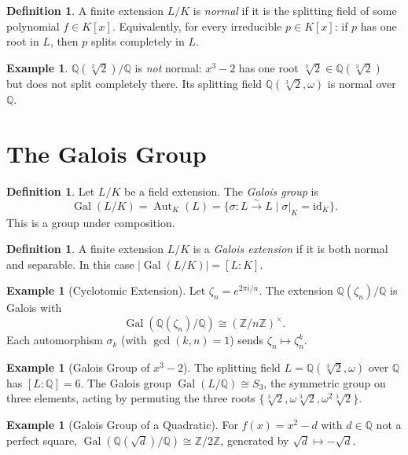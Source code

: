 \documentclass[12pt,a4paper]{amsart}
\theoremstyle{definition}
\newtheorem{definition}[theorem]{Definition}
\newtheorem{example}[theorem]{Example}
\newcommand{\Q}{\mathbb{Q}}
\newcommand{\Z}{\mathbb{Z}}
\newcommand{\Gal}{\operatorname{Gal}}
\newcommand{\Aut}{\operatorname{Aut}}
\begin{document}
\begin{definition}
A finite extension $L/K$ is \emph{normal} if it is the splitting field of some
polynomial $f \in K[x]$. Equivalently, for every irreducible $p \in K[x]$:
if $p$ has one root in $L$, then $p$ splits completely in $L$.
\end{definition}

\begin{example}
$\Q(\sqrt[3]{2})/\Q$ is \emph{not} normal: $x^3 - 2$ has one root
$\sqrt[3]{2} \in \Q(\sqrt[3]{2})$ but does not split completely there.
Its splitting field $\Q(\sqrt[3]{2},\omega)$ is normal over $\Q$.
\end{example}

\section{The Galois Group}\label{sec:galoisgroup}

\begin{definition}
Let $L/K$ be a field extension. The \emph{Galois group} is
\[
  \Gal(L/K) = \Aut_K(L) = \{\sigma: L \xrightarrow{\sim} L \mid \sigma|_K = \mathrm{id}_K\}.
\]
This is a group under composition.
\end{definition}

\begin{definition}
A finite extension $L/K$ is a \emph{Galois extension} if it is both normal and
separable. In this case $|\Gal(L/K)| = [L:K]$.
\end{definition}

\begin{example}[Cyclotomic Extension]
Let $\zeta_n = e^{2\pi i/n}$. The extension $\Q(\zeta_n)/\Q$ is Galois with
\[
  \Gal(\Q(\zeta_n)/\Q) \cong (\Z/n\Z)^\times.
\]
Each automorphism $\sigma_k$ (with $\gcd(k,n)=1$) sends $\zeta_n \mapsto \zeta_n^k$.
\end{example}

\begin{example}[Galois Group of $x^3 - 2$]
The splitting field $L = \Q(\sqrt[3]{2}, \omega)$ over $\Q$ has $[L:\Q] = 6$.
The Galois group $\Gal(L/\Q) \cong S_3$, the symmetric group on three elements,
acting by permuting the three roots $\{\sqrt[3]{2}, \omega\sqrt[3]{2},
\omega^2\sqrt[3]{2}\}$.
\end{example}

\begin{example}[Galois Group of a Quadratic]
For $f(x) = x^2 - d$ with $d \in \Q$ not a perfect square,
$\Gal(\Q(\sqrt{d})/\Q) \cong \Z/2\Z$,
generated by $\sqrt{d} \mapsto -\sqrt{d}$.
\end{example}
\end{document}
